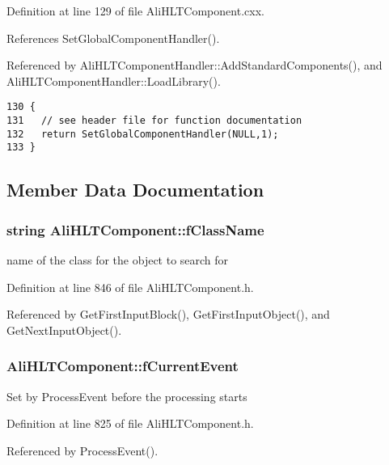 Definition at line 129 of file Ali\-HLTComponent.cxx.

References Set\-Global\-Component\-Handler().

Referenced by Ali\-HLTComponent\-Handler::Add\-Standard\-Components(), and Ali\-HLTComponent\-Handler::Load\-Library().

\footnotesize\begin{verbatim}130 {
131   // see header file for function documentation
132   return SetGlobalComponentHandler(NULL,1);
133 }
\end{verbatim}\normalsize 




\subsection{Member Data Documentation}
\subsubsection{\setlength{\rightskip}{0pt plus 5cm}string {\bf Ali\-HLTComponent::f\-Class\-Name}\hspace{0.3cm}{\tt  [private]}}\label{classAliHLTComponent_r8}


name of the class for the object to search for 

Definition at line 846 of file Ali\-HLTComponent.h.

Referenced by Get\-First\-Input\-Block(), Get\-First\-Input\-Object(), and Get\-Next\-Input\-Object().
\subsubsection{ {\bf Ali\-HLTComponent::f\-Current\-Event}\hspace{0.3cm}{\tt  [private]}}\label{classAliHLTComponent_r1}


Set by Process\-Event before the processing starts 

Definition at line 825 of file Ali\-HLTComponent.h.

Referenced by Process\-Event().

